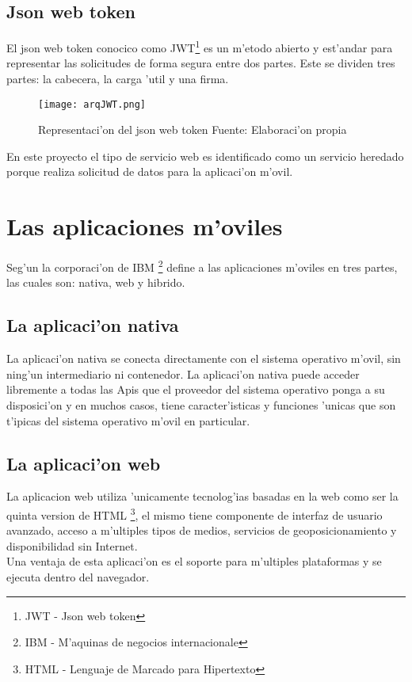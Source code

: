 \subsection{Json web token}
El json web token conocico como JWT\footnote{JWT - Json web token} es un m'etodo abierto y est'andar para representar las  solicitudes de forma segura entre dos partes. Este se dividen tres partes: la cabecera, la carga 'util y una firma.

\begin{figure}[H]
\centering
\texttt{[image: arqJWT.png]}
\captionsetup{justification=centering,margin=2cm}
\caption{ Representaci'on del json web token Fuente: Elaboraci'on propia}
\end{figure}

En este proyecto el tipo de servicio web es identificado como un servicio heredado porque realiza solicitud de datos para la aplicaci'on m'ovil.

\section{Las aplicaciones m'oviles}
Seg'un la corporaci'on de IBM \footnote{IBM - M'aquinas de negocios internacionale}  define a las aplicaciones m'oviles en tres partes, las cuales son: nativa, web y hibrido. \cite{Ibm2012}

\subsection{La aplicaci'on nativa}
La aplicaci'on nativa se conecta directamente con el sistema operativo m'ovil, sin ning'un intermediario ni contenedor. La aplicaci'on nativa puede acceder libremente a todas las Apis que el proveedor del sistema operativo ponga a su disposici'on y en muchos casos, tiene caracter'isticas y funciones 'unicas que son t'ipicas del sistema operativo m'ovil en particular.
\subsection{La aplicaci'on web}
La aplicacion web utiliza 'unicamente tecnolog'ias basadas en la web como ser la quinta version de HTML \footnote{HTML - Lenguaje de Marcado para Hipertexto}, el mismo tiene componente de interfaz de usuario avanzado, acceso a m'ultiples tipos de medios, servicios de geoposicionamiento y disponibilidad sin Internet.\\
Una ventaja de esta aplicaci'on es el soporte para m'ultiples plataformas y se ejecuta dentro del navegador.
